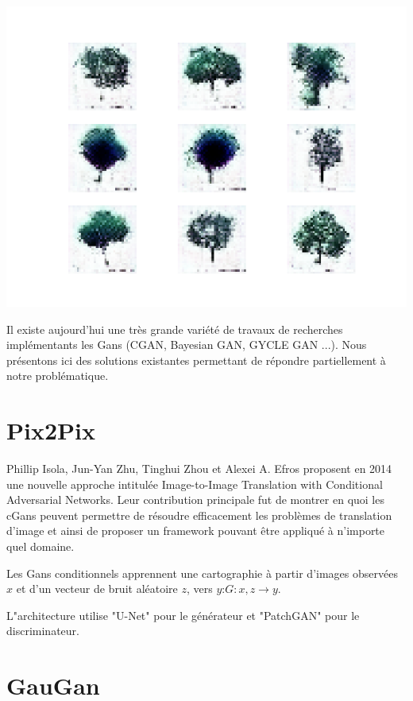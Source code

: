 \documentclass[a4paper, 12pt]{book}
\begin{document}
\begin{center}
\includegraphics[scale=0.7]{images/tests_cgan.png}
\label{fig1}
\end{center}


Il existe aujourd'hui une très grande variété de travaux de recherches implémentants les Gans (CGAN, Bayesian GAN, GYCLE GAN ...). Nous présentons ici des solutions existantes permettant de répondre partiellement à notre problématique.


\section{Pix2Pix}
Phillip Isola, Jun-Yan Zhu, Tinghui Zhou et Alexei A. Efros proposent en 2014 une nouvelle approche intitulée Image-to-Image Translation with Conditional Adversarial Networks.\cite{DBLP:journals/corr/GatysEB15a}
Leur contribution principale fut de montrer en quoi les cGans peuvent permettre de résoudre efficacement les problèmes de translation d'image et ainsi de proposer un framework pouvant être appliqué à n'importe quel domaine.

Les Gans conditionnels apprennent une cartographie à partir d’images observées $x$ et d’un vecteur de bruit aléatoire $z$, vers $y$:$G:{x,z} →y$. 

L"architecture utilise "U-Net" pour le générateur et "PatchGAN" pour le discriminateur.



\section{GauGan}
\end{document}
